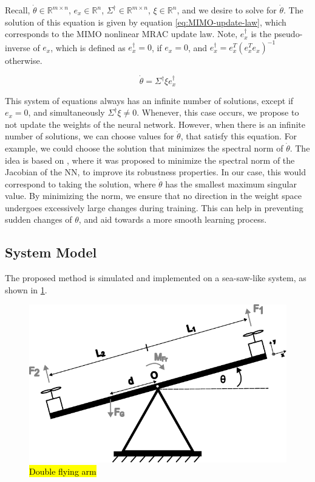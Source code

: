 Recall, $\dot\theta\in\mathbb{R}^{m\times n}$, $e_x \in\mathbb{R}^{n}$, $\Sigma^{\dagger}\in\mathbb{R}^{m\times n}$, $\xi\in\mathbb{R}^{n}$, and we desire to solve for $\dot\theta$. The solution of this equation is given by equation \eqref{eq:MIMO-update-law}, which corresponds to the MIMO nonlinear MRAC update law. Note, $e_x^{\dagger}$ is the pseudo-inverse of $e_x$, which is defined as $e_x^{\dagger}=0$, if $e_x=0$, and $e_x^{\dagger}=e_x^T(e_x^Te_x)^{-1}$ otherwise.

\begin{equation}
\dot\theta =\Sigma^{\dagger}\xi e_x^{\dagger}
    \label{eq:MIMO-update-law}
\end{equation}

This system of equations always has an infinite number of solutions, except if  $e_x=0$, and simultaneously $\Sigma^{\dagger}\xi\neq 0$. Whenever, this case occurs, we propose to not update the weights of the neural network. However, when there is an infinite number of solutions, we can choose values for $\dot\theta$, that satisfy this equation. For example, we could choose the solution that minimizes the spectral norm of $\dot\theta$. The idea is based on \cite{yoshida2017spectralnormregularizationimproving, johansson_improved_2023}, where it was proposed to minimize the spectral norm of the Jacobian of the NN, to improve its robustness properties. In our case, this would correspond to taking the solution, where $\dot\theta$ has the smallest maximum singular value. By minimizing the norm, we ensure that no direction in the weight space undergoes excessively large changes during training. This can help in preventing sudden changes of $\theta$, and aid towards a more smooth learning process.

\subsection{System Model}
The proposed method is simulated and implemented on a sea-saw-like system, as shown in \cref{fig:flying-arm}. 

\begin{figure}
    \includegraphics[width=\linewidth]{images/DoubleFlyingArm.pdf}
    \caption{\hl{Double flying arm}}
    \label{fig:flying-arm}
\end{figure}

